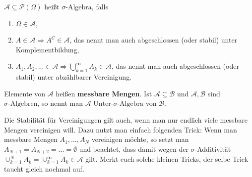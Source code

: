 \begin{deff} 
	$\mathcal{A} \subseteq \mathcal{P}(\Omega)$ heißt $\sigma\text{-Algebra}$, falls
	\begin{enumerate}[label=(\roman*)]
		\item $\Omega \in \mathcal{A}$,
		\item $A \in \mathcal{A} \Rightarrow A^C \in \mathcal{A}$, das nennt man auch abgeschlossen (oder stabil) unter Komplementbildung,
		\item $A_{1},A_{2},... \in \mathcal{A} \Rightarrow \bigcup\limits_{k=1}^{\infty}A_k \in \mathcal{A}$, das nennt man auch abgeschlossen (oder stabil) unter abzählbarer Vereinigung.
	\end{enumerate}
	Elemente von $\mathcal{A}$ heißen \textbf{messbare Mengen}. Ist $\mathcal{A} \subseteq \mathcal{B}$ und $\mathcal{A}, \mathcal{B}$ sind $\sigma\text{-Algebren}$, so nennt man $\mathcal{A}$ $\text{Unter-}\sigma\text{-Algebra}$ von $\mathcal{B}$.
\end{deff}
Die Stabilit\"at f\"ur Vereinigungen gilt auch, wenn man nur endlich viele messbare Mengen vereinigen will. Dazu nutzt man einfach folgenden Trick: Wenn man messbare Mengen $A_1,...,A_N$ vereinigen m\"ochte, so setzt man $A_{N+1}=A_{N+2}=... =\emptyset$ und beachtet, dass damit wegen der $\sigma$-Additivit\"at $\cup_{k=1}^N A_k=\cup_{k=1}^\infty A_k\in \mathcal A$ gilt. Merkt euch solche kleinen Tricks, der selbe Trick taucht gleich nochmal auf.

